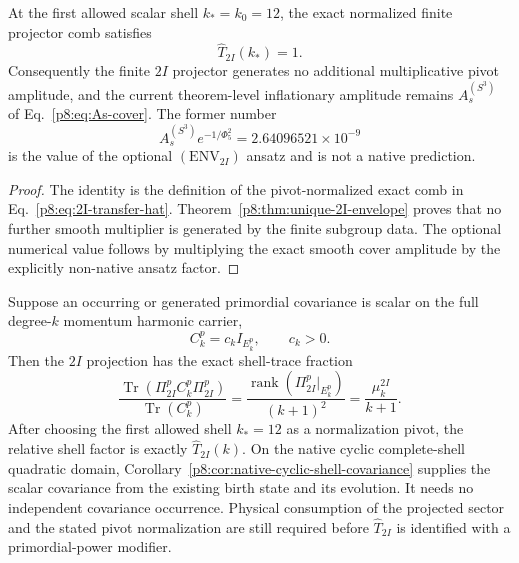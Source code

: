 \documentclass[12pt,a4paper]{article}
\begin{document}
\begin{corollary}
\label{p8:cor:bh-pivot-normalization}
At the first allowed scalar shell \(k_*=k_0=12\), the exact normalized finite
projector comb satisfies
\begin{equation}
\label{p8:eq:NBH-pivot-one}
\widehat T_{2I}(k_*)=1.
\end{equation}
Consequently the finite \(2I\) projector generates no additional
multiplicative pivot amplitude, and the current theorem-level inflationary
amplitude remains \(A_s^{(S^3)}\) of Eq.~\eqref{p8:eq:As-cover}.  The former
number
\begin{equation}
\label{p8:eq:As-obs-closed-2I}
A_s^{(S^3)}e^{-1/\Phi_5^2}=2.64096521\times10^{-9}
\end{equation}
is the value of the optional \((\mathrm{ENV}_{2I})\) ansatz and is not a
native prediction.
\end{corollary}

\begin{proof}
The identity is the definition of the pivot-normalized exact comb in
Eq.~\eqref{p8:eq:2I-transfer-hat}.  Theorem~\ref{p8:thm:unique-2I-envelope}
proves that no further smooth multiplier is generated by the finite subgroup
data.  The optional numerical value follows by multiplying the exact smooth
cover amplitude by the explicitly non-native ansatz factor.
\end{proof}

\begin{proposition}
\label{p8:prop:g30b-conditional-isotropic-2i-power}
Suppose an occurring or generated primordial covariance is scalar on the
full degree-$k$ momentum harmonic carrier,
\[
 C_k^p=c_k I_{E_k^p},\qquad c_k>0.
\]
Then the $2I$ projection has the exact shell-trace fraction
\[
 \boxed{
 \frac{\operatorname{Tr}(\Pi_{2I}^pC_k^p\Pi_{2I}^p)}
 {\operatorname{Tr}(C_k^p)}
 =\frac{\operatorname{rank}(\Pi_{2I}^p|_{E_k^p})}{(k+1)^2}
 =\frac{\mu_k^{2I}}{k+1}.}
\]
After choosing the first allowed shell $k_*=12$ as a normalization pivot, the
relative shell factor is exactly $\widehat T_{2I}(k)$.  On the native cyclic complete-shell quadratic domain,
Corollary~\ref{p8:cor:native-cyclic-shell-covariance} supplies the scalar
covariance from the existing birth state and its evolution.  It needs no
independent covariance occurrence.  Physical consumption of the projected
sector and the stated pivot normalization are still required before
$\widehat T_{2I}$ is identified with a primordial-power modifier.
\end{proposition}
\end{document}
